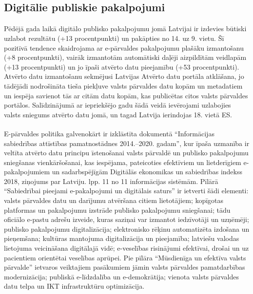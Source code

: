 \subsection{Digitālie publiskie pakalpojumi}
\paragraph{}
Pēdējā gada laikā digitālo publisko pakalpojumu jomā Latvijai ir izdevies būtiski uzlabot
rezultātu (+13 procentpunkti) un pakāpties no 14. uz 9. vietu. Šī pozitīvā tendence
skaidrojama ar e-pārvaldes pakalpojumu plašāku izmantošanu (+8 procentpunkti), vairāk
izmantotām automātiski daļēji aizpildītām veidlapām (+13 procentpunkti) un jo īpaši atvērto
datu pieejamību (+53 procentpunkti). Atvērto datu izmantošanu sekmējusi Latvijas Atvērto
datu portāla atklāšana, jo tādējādi nodrošināta tieša piekļuve valsts pārvaldes datu kopām
un metadatiem un iespēja savienot tās ar citām datu kopām, kas publicētas citos valsts
pārvaldes portālos. Salīdzinājumā ar iepriekšējo gadu šādā veidā ievērojami uzlabojies
valsts sniegums atvērto datu jomā, un tagad Latvija ierindojas 18. vietā ES.
\paragraph{}
E-pārvaldes politika galvenokārt ir izklāstīta dokumentā “Informācijas sabiedrības attīstības
pamatnostādnes 2014.–2020. gadam”, kur īpaša uzmanība ir veltīta atvērto datu principu
īstenošanai valsts pārvaldē un publisko pakalpojumu sniegšanas vienkāršošanai, kas
iespējama, pateicoties efektīviem un lietderīgiem e-pakalpojumiem un sadarbspējīgām
Digitālās ekonomikas un sabiedrības indekss 2018, ziņojums par Latviju. lpp. 11 no 11
informācijas sistēmām. Pīlārā “Sabiedrībai pieejami e-pakalpojumi un digitālais saturs” ir
ietverti šādi elementi: valsts pārvaldes datu un darījumu atvēršana citiem lietotājiem;
kopīgotas platformas un pakalpojumu izstrāde publisko pakalpojumu sniegšanai; tādu
oficiālo e-pastu adrešu izveide, kuras saziņai var izmantot iedzīvotāji un uzņēmēji; publisko
pakalpojumu digitalizācija; elektronisko rēķinu automatizēta izdošana un pieņemšana;
kultūras mantojuma digitalizācija un pieejamība; latviešu valodas lietojuma veicināšana
digitālajā vidē; e-veselības risinājumi efektīvai, drošai un uz pacientiem orientētai veselības
aprūpei. Pie pīlāra “Mūsdienīga un efektīva valsts pārvalde” ietvaros veiktajiem pasākumiem
jāmin valsts pārvaldes pamatdarbības modernizācija; publiskā e-līdzdalība un e-demokrātija;
vienota valsts pārvaldes datu telpa un IKT infrastruktūru optimizācija.
